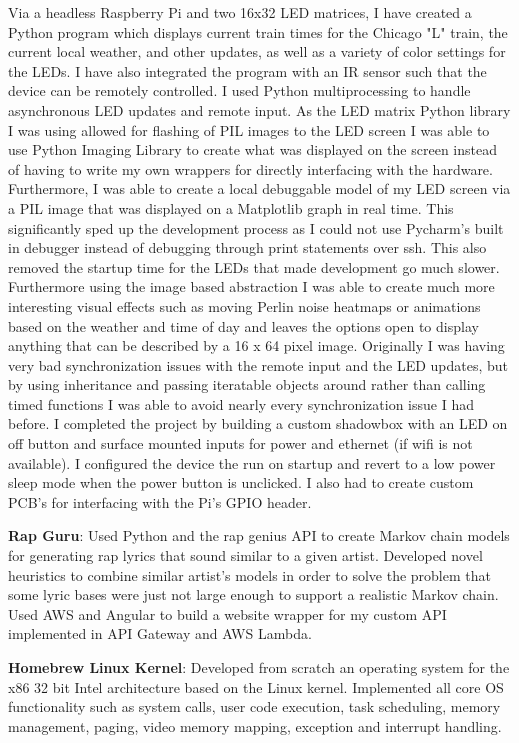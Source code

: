 \documentclass[letterpaper,10pt]{article}
\newcommand{\resumeItem}[2]{
  \item\small{
    \textbf{#1}{: #2 \vspace{-2pt}}
  }
}
\newcommand{\resumeSubItem}[2]{\resumeItem{#1}{#2}\vspace{-4pt}}
\begin{document}
      {Via a headless Raspberry Pi and two 16x32 LED matrices, I have created a Python program which displays current train times for the Chicago "L" train, the current local weather, and other updates, as well as a variety of color settings for the LEDs. I have also integrated the program with an IR sensor such that the device can be remotely controlled. I used Python multiprocessing to handle asynchronous LED updates and remote input. As the LED matrix Python library I was using allowed for flashing of PIL images to the LED screen I was able to use Python Imaging Library to create what was displayed on the screen instead of having to write my own wrappers for directly interfacing with the hardware. Furthermore, I was able to create a local debuggable model of my LED screen via a PIL image that was displayed on a Matplotlib graph in real time. This significantly sped up the development process as I could not use Pycharm's built in debugger instead of debugging through print statements over ssh. This also removed the startup time for the LEDs that made development go much slower. Furthermore using the image based abstraction I was able to create much more interesting visual effects such as moving Perlin noise heatmaps or animations based on the weather and time of day and leaves the options open to display anything that can be described by a 16 x 64 pixel image. Originally I was having very bad synchronization issues with the remote input and the LED updates, but by using inheritance and passing iteratable objects around rather than calling timed functions I was able to avoid nearly every synchronization issue I had before. I completed the project by building a custom shadowbox with an LED on off button and surface mounted inputs for power and ethernet (if wifi is not available). I configured the device the run on startup and revert to a low power sleep mode when the power button is unclicked. I also had to create custom PCB's for interfacing with the Pi's GPIO header.}
    \resumeSubItem{Rap Guru}
      {Used Python and the rap genius API to create Markov chain models for generating rap lyrics that sound similar to a given artist. Developed novel heuristics to combine similar artist's models in order to solve the problem that some lyric bases were just not large enough to support a realistic Markov chain. Used AWS and Angular to build a website wrapper for my custom API implemented in API Gateway and AWS Lambda. }
     \resumeSubItem{Homebrew Linux Kernel}
     {Developed from scratch an operating system for the x86 32 bit Intel architecture based on the Linux kernel. Implemented all core OS functionality such as system calls, user code execution, task scheduling, memory management, paging, video memory mapping, exception and interrupt handling.}
\end{document}

